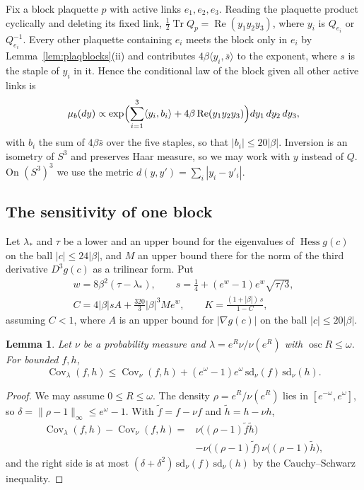 \documentclass[11pt]{amsart}
\newtheorem{lemma}[theorem]{Lemma}
\theoremstyle{definition}
\theoremstyle{remark}
\numberwithin{equation}{section}
\newcommand{\Tr}{\operatorname{Tr}}
\newcommand{\Hess}{\operatorname{Hess}}
\newcommand{\Cov}{\operatorname{Cov}}
\newcommand{\ip}[2]{\langle #1,#2\rangle}
\begin{document}
Fix a block plaquette $p$ with active links $e_1,e_2,e_3$. Reading the
plaquette product cyclically and deleting its fixed link, $\frac12\Tr Q_p=
\operatorname{Re}(y_1y_2y_3)$, where $y_i$ is $Q_{e_i}$ or $Q_{e_i}^{-1}$.
Every other plaquette containing $e_i$ meets the block only in $e_i$ by
Lemma~\ref{lem:plaqblocks}(ii) and contributes $4\beta\ip{y_i}{\bar s}$ to
the exponent, where $s$ is the staple of $y_i$ in it. Hence the conditional
law of the block given all other active links is
\begin{equation}\label{eq:blocklaw}
\mu_b(dy)\propto\exp\Bigl(\sum_{i=1}^3\ip{y_i}{b_i}+4\beta\operatorname{Re}
(y_1y_2y_3)\Bigr)dy_1\,dy_2\,dy_3,
\end{equation}
with $b_i$ the sum of $4\beta\bar s$ over the five staples, so that
$|b_i|\le20|\beta|$. Inversion is an isometry of $S^3$ and preserves Haar
measure, so we may work with $y$ instead of $Q$. On $(S^3)^3$ we use the
metric $d(y,y')=\sum_i|y_i-y'_i|$.

\subsection{The sensitivity of one block}

Let $\lambda_*$ and $\tau$ be a lower and an upper bound for the
eigenvalues of $\Hess g(c)$ on the ball $|c|\le24|\beta|$, and $M$ an upper
bound there for the norm of the third derivative $D^3g(c)$ as a trilinear
form. Put
\begin{equation}\label{eq:blockconst}
\begin{gathered}
w=8\beta^2(\tau-\lambda_*),\qquad s=\tfrac14+(e^w-1)e^w\sqrt{\tau/3},\\
C=4|\beta|sA+\tfrac{320}3|\beta|^3Me^w,\qquad
K=\frac{(1+|\beta|)\,s}{1-C},
\end{gathered}
\end{equation}
assuming $C<1$, where $A$ is an upper bound for $|\nabla g(c)|$ on the ball
$|c|\le20|\beta|$.

\begin{lemma}\label{lem:tilt}
Let $\nu$ be a probability measure and $\lambda=e^R\nu/\nu(e^R)$ with
$\operatorname{osc}R\le\omega$. For bounded $f,h$,
\[
\Cov_\lambda(f,h)\le\Cov_\nu(f,h)+(e^\omega-1)e^\omega\,\mathrm{sd}_\nu(f)
\,\mathrm{sd}_\nu(h).
\]
\end{lemma}

\begin{proof}
We may assume $0\le R\le\omega$. The density $\rho=e^R/\nu(e^R)$ lies in
$[e^{-\omega},e^\omega]$, so $\delta=\|\rho-1\|_\infty\le e^\omega-1$. With
$\tilde f=f-\nu f$ and $\tilde h=h-\nu h$,
\[
\begin{split}
\Cov_\lambda(f,h)-\Cov_\nu(f,h)={}&\nu\bigl((\rho-1)\tilde f\tilde h\bigr)\\
&-\nu\bigl((\rho-1)\tilde f\bigr)\,\nu\bigl((\rho-1)\tilde h\bigr),
\end{split}
\]
and the right side is at most $(\delta+\delta^2)\,\mathrm{sd}_\nu(f)\,
\mathrm{sd}_\nu(h)$ by the Cauchy--Schwarz inequality.
\end{proof}
\end{document}
